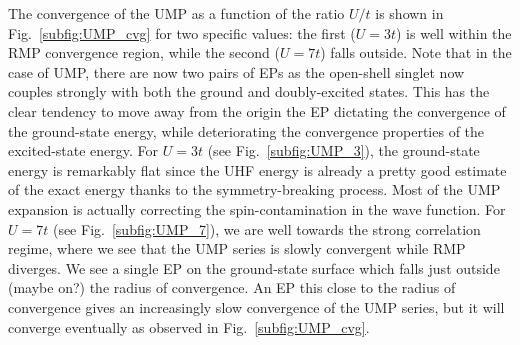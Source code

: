 \documentclass[aps,prb,reprint,noshowkeys,superscriptaddress]{revtex4-1}
\begin{document}
The convergence of the UMP as a function of the ratio $U/t$ is shown in Fig.~\ref{subfig:UMP_cvg} for two specific values: the first ($U = 3t$) is well within the RMP convergence region, while the second ($U = 7t$) falls outside.
Note that in the case of UMP, there are now two pairs of EPs as the open-shell singlet now couples strongly with both the ground and doubly-excited states.
This has the clear tendency to move away from the origin the EP dictating the convergence of the ground-state energy, while deteriorating the convergence properties of the excited-state energy.
For $U = 3t$ (see Fig.~\ref{subfig:UMP_3}), the ground-state energy is remarkably flat since the UHF energy is already a pretty good estimate of the exact energy thanks to the symmetry-breaking process.
Most of the UMP expansion is actually correcting the spin-contamination in the wave function.
For $U = 7t$ (see Fig.~\ref{subfig:UMP_7}), we are well towards the strong correlation regime, where we see that the UMP series is slowly convergent while RMP diverges.
We see a single EP on the ground-state surface which falls just outside (maybe on?) the radius of convergence. 
An EP this close to the radius of convergence gives an increasingly slow convergence of the UMP series, but it will converge eventually as observed in Fig.~\ref{subfig:UMP_cvg}.
\end{document}
